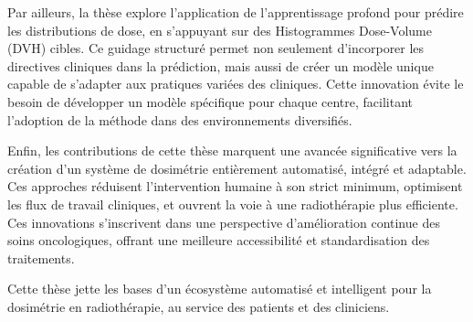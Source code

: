{	Par ailleurs, la thèse explore l’application de l’apprentissage profond pour prédire les distributions de dose, en s’appuyant sur des Histogrammes Dose-Volume (DVH) cibles.
	Ce guidage structuré permet non seulement d’incorporer les directives cliniques dans la prédiction, mais aussi de créer un modèle unique capable de s’adapter aux pratiques variées des cliniques.
	Cette innovation évite le besoin de développer un modèle spécifique pour chaque centre, facilitant l’adoption de la méthode dans des environnements diversifiés.
	
	Enfin, les contributions de cette thèse marquent une avancée significative vers la création d’un système de dosimétrie entièrement automatisé, intégré et adaptable.
	Ces approches réduisent l’intervention humaine à son strict minimum, optimisent les flux de travail cliniques, et ouvrent la voie à une radiothérapie plus efficiente.
	Ces innovations s’inscrivent dans une perspective d’amélioration continue des soins oncologiques, offrant une meilleure accessibilité et standardisation des traitements.
	
	Cette thèse jette les bases d’un écosystème automatisé et intelligent pour la dosimétrie en radiothérapie, au service des patients et des cliniciens.
}